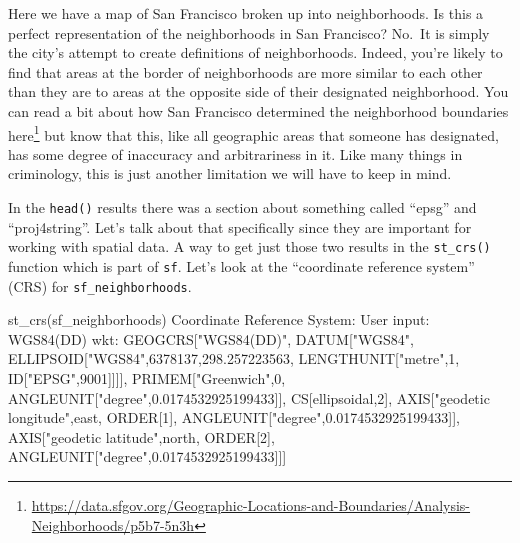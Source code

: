 \documentclass[
]{krantz}
\makeatletter
\newenvironment{Shaded}{\begin{snugshade}}{\end{snugshade}}
\newcommand{\DecValTok}[1]{\textcolor[rgb]{0.06,0.06,0.06}{#1}}
\newcommand{\FloatTok}[1]{\textcolor[rgb]{0.06,0.06,0.06}{#1}}
\newcommand{\FunctionTok}[1]{\textcolor[rgb]{0,0,0}{#1}}
\newcommand{\NormalTok}[1]{#1}
\newcommand{\SpecialCharTok}[1]{\textcolor[rgb]{0,0,0}{#1}}
\newcommand{\StringTok}[1]{\textcolor[rgb]{0.5,0.5,0.5}{#1}}
\renewcommand{\href}[2]{#2\footnote{\url{#1}}}
\newenvironment{kframe}{%
\medskip{}
\setlength{\fboxsep}{.8em}
 \def\at@end@of@kframe{}%
 \ifinner\ifhmode%
  \def\at@end@of@kframe{\end{minipage}}%
  \begin{minipage}{\columnwidth}%
 \fi\fi%
 \def\FrameCommand##1{\hskip\@totalleftmargin \hskip-\fboxsep
 \colorbox{shadecolor}{##1}\hskip-\fboxsep
     \hskip-\linewidth \hskip-\@totalleftmargin \hskip\columnwidth}%
 \MakeFramed {\advance\hsize-\width
   \@totalleftmargin\z@ \linewidth\hsize
   \@setminipage}}%
 {\par\unskip\endMakeFramed%
 \at@end@of@kframe}
\renewenvironment{Shaded}{\begin{kframe}}{\end{kframe}}
\makeatother
\begin{document}
Here we have a map of San Francisco broken up into neighborhoods. Is this a perfect representation of the neighborhoods in San Francisco? No.~It is simply the city's attempt to create definitions of neighborhoods. Indeed, you're likely to find that areas at the border of neighborhoods are more similar to each other than they are to areas at the opposite side of their designated neighborhood. You can read a bit about how San Francisco determined the neighborhood boundaries \href{https://data.sfgov.org/Geographic-Locations-and-Boundaries/Analysis-Neighborhoods/p5b7-5n3h}{here} but know that this, like all geographic areas that someone has designated, has some degree of inaccuracy and arbitrariness in it. Like many things in criminology, this is just another limitation we will have to keep in mind.

In the \texttt{head()} results there was a section about something called ``epsg'' and ``proj4string''. Let's talk about that specifically since they are important for working with spatial data. A way to get just those two results in the \texttt{st\_crs()} function which is part of \texttt{sf}. Let's look at the ``coordinate reference system'' (CRS) for \texttt{sf\_neighborhoods}.

\begin{Shaded}
\begin{Highlighting}[]
\FunctionTok{st\_crs}\NormalTok{(sf\_neighborhoods)}
\NormalTok{Coordinate Reference System}\SpecialCharTok{:}
\NormalTok{  User input}\SpecialCharTok{:} \FunctionTok{WGS84}\NormalTok{(DD) }
\NormalTok{  wkt}\SpecialCharTok{:}
\NormalTok{GEOGCRS[}\StringTok{"WGS84(DD)"}\NormalTok{,}
\NormalTok{    DATUM[}\StringTok{"WGS84"}\NormalTok{,}
\NormalTok{        ELLIPSOID[}\StringTok{"WGS84"}\NormalTok{,}\DecValTok{6378137}\NormalTok{,}\FloatTok{298.257223563}\NormalTok{,}
\NormalTok{            LENGTHUNIT[}\StringTok{"metre"}\NormalTok{,}\DecValTok{1}\NormalTok{,}
\NormalTok{                ID[}\StringTok{"EPSG"}\NormalTok{,}\DecValTok{9001}\NormalTok{]]]],}
\NormalTok{    PRIMEM[}\StringTok{"Greenwich"}\NormalTok{,}\DecValTok{0}\NormalTok{,}
\NormalTok{        ANGLEUNIT[}\StringTok{"degree"}\NormalTok{,}\FloatTok{0.0174532925199433}\NormalTok{]],}
\NormalTok{    CS[ellipsoidal,}\DecValTok{2}\NormalTok{],}
\NormalTok{        AXIS[}\StringTok{"geodetic longitude"}\NormalTok{,east,}
\NormalTok{            ORDER[}\DecValTok{1}\NormalTok{],}
\NormalTok{            ANGLEUNIT[}\StringTok{"degree"}\NormalTok{,}\FloatTok{0.0174532925199433}\NormalTok{]],}
\NormalTok{        AXIS[}\StringTok{"geodetic latitude"}\NormalTok{,north,}
\NormalTok{            ORDER[}\DecValTok{2}\NormalTok{],}
\NormalTok{            ANGLEUNIT[}\StringTok{"degree"}\NormalTok{,}\FloatTok{0.0174532925199433}\NormalTok{]]]}
\end{Highlighting}
\end{Shaded}
\end{document}
